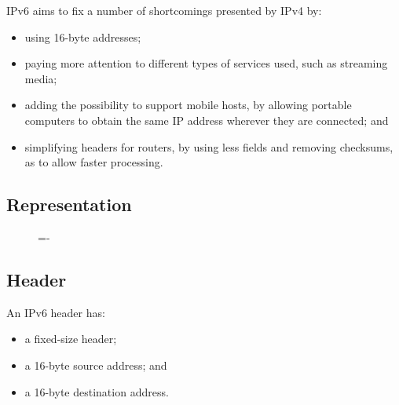 \documentclass[a4paper]{systems-software}
\begin{document}
IPv6 aims to fix a number of shortcomings presented by IPv4 by:
\begin{itemize}
	\item using 16-byte addresses;
	\item paying more attention to different types of services used, such as streaming media;
	\item adding the possibility to support mobile hosts, by allowing portable computers to obtain the same IP address wherever they are connected; and
	\item simplifying headers for routers, by using less fields and removing checksums, as to allow faster processing.
\end{itemize}


\subsection*{Representation}

\begin{figure}[H]
	\lineskip=-\fboxrule
\end{figure}


\subsection*{Header}

An IPv6 header has:
\begin{itemize}
	\item a fixed-size header;
	\item a 16-byte source address; and
	\item a 16-byte destination address.
\end{itemize}
\end{document}
